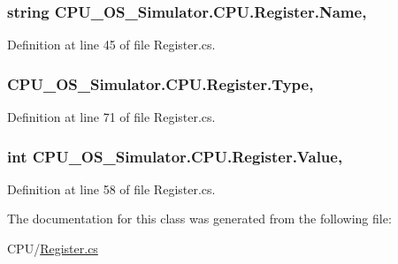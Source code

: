 \subsubsection[{Name}]{\setlength{\rightskip}{0pt plus 5cm}string C\+P\+U\+\_\+\+O\+S\+\_\+\+Simulator.\+C\+P\+U.\+Register.\+Name\hspace{0.3cm}{\ttfamily [get]}, {\ttfamily [set]}}\label{class_c_p_u___o_s___simulator_1_1_c_p_u_1_1_register_a75621754d2c4c740c52b6c21a8151dc4}


Definition at line 45 of file Register.\+cs.

\hypertarget{class_c_p_u___o_s___simulator_1_1_c_p_u_1_1_register_ac9df7ddedb74ab974a57a334b42e0381}{}
\subsubsection[{Type}]{ C\+P\+U\+\_\+\+O\+S\+\_\+\+Simulator.\+C\+P\+U.\+Register.\+Type\hspace{0.3cm}{\ttfamily [get]}, {\ttfamily [set]}}\label{class_c_p_u___o_s___simulator_1_1_c_p_u_1_1_register_ac9df7ddedb74ab974a57a334b42e0381}


Definition at line 71 of file Register.\+cs.

\hypertarget{class_c_p_u___o_s___simulator_1_1_c_p_u_1_1_register_a1cabe4ad65d4dc6267be9f34d682e181}{}
\subsubsection[{Value}]{\setlength{\rightskip}{0pt plus 5cm}int C\+P\+U\+\_\+\+O\+S\+\_\+\+Simulator.\+C\+P\+U.\+Register.\+Value\hspace{0.3cm}{\ttfamily [get]}, {\ttfamily [set]}}\label{class_c_p_u___o_s___simulator_1_1_c_p_u_1_1_register_a1cabe4ad65d4dc6267be9f34d682e181}


Definition at line 58 of file Register.\+cs.



The documentation for this class was generated from the following file\+:\begin{DoxyCompactItemize}
\item 
C\+P\+U/\hyperlink{_register_8cs}{Register.\+cs}\end{DoxyCompactItemize}
